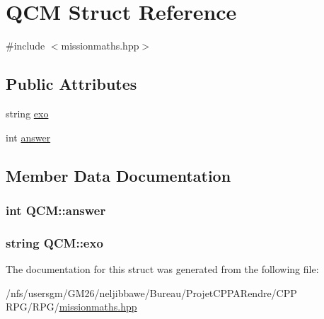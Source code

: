 \hypertarget{struct_q_c_m}{\section{Q\-C\-M Struct Reference}
\label{struct_q_c_m}
}


{\ttfamily \#include $<$missionmaths.\-hpp$>$}

\subsection*{Public Attributes}
\begin{DoxyCompactItemize}
\item 
string \hyperlink{struct_q_c_m_a6d24b233b44048c23595712c0e03fb47}{exo}
\item 
int \hyperlink{struct_q_c_m_ad90e9b83f64b15f51e3f920922670fa4}{answer}
\end{DoxyCompactItemize}


\subsection{Member Data Documentation}
\hypertarget{struct_q_c_m_ad90e9b83f64b15f51e3f920922670fa4}{
\subsubsection[{answer}]{\setlength{\rightskip}{0pt plus 5cm}int Q\-C\-M\-::answer}}\label{struct_q_c_m_ad90e9b83f64b15f51e3f920922670fa4}
\hypertarget{struct_q_c_m_a6d24b233b44048c23595712c0e03fb47}{
\subsubsection[{exo}]{\setlength{\rightskip}{0pt plus 5cm}string Q\-C\-M\-::exo}}\label{struct_q_c_m_a6d24b233b44048c23595712c0e03fb47}


The documentation for this struct was generated from the following file\-:\begin{DoxyCompactItemize}
\item 
/nfs/usersgm/\-G\-M26/neljibbawe/\-Bureau/\-Projet\-C\-P\-P\-A\-Rendre/\-C\-P\-P R\-P\-G/\-R\-P\-G/\hyperlink{missionmaths_8hpp}{missionmaths.\-hpp}\end{DoxyCompactItemize}
